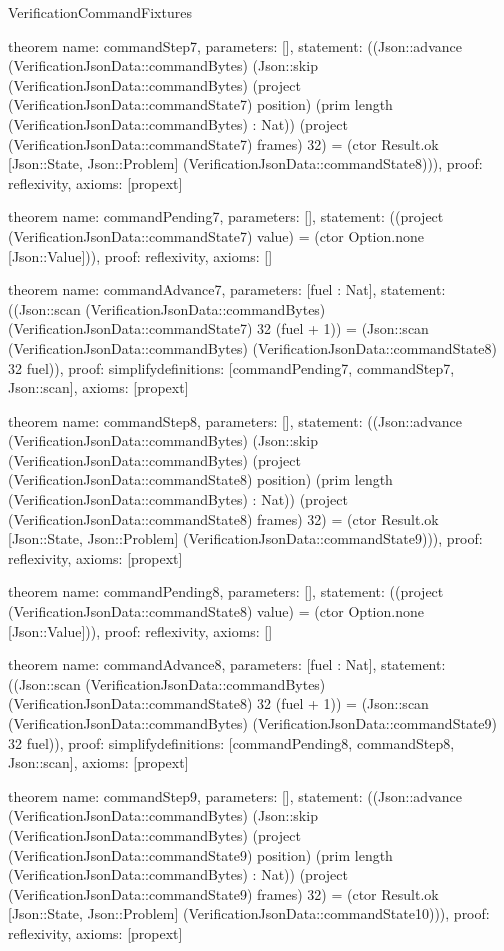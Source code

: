 \begin{lexlean}{VerificationCommandFixtures}
\begin{semanticmodule}
theorem{
  name: commandStep7,
  parameters: [],
  statement: ((Json::advance (VerificationJsonData::commandBytes) (Json::skip (VerificationJsonData::commandBytes) (project (VerificationJsonData::commandState7) position) (prim length (VerificationJsonData::commandBytes) : Nat)) (project (VerificationJsonData::commandState7) frames) 32) = (ctor Result.ok [Json::State, Json::Problem] (VerificationJsonData::commandState8))),
  proof: reflexivity{},
  axioms: [propext]
}

theorem{
  name: commandPending7,
  parameters: [],
  statement: ((project (VerificationJsonData::commandState7) value) = (ctor Option.none [Json::Value])),
  proof: reflexivity{},
  axioms: []
}

theorem{
  name: commandAdvance7,
  parameters: [fuel : Nat],
  statement: ((Json::scan (VerificationJsonData::commandBytes) (VerificationJsonData::commandState7) 32 (fuel + 1)) = (Json::scan (VerificationJsonData::commandBytes) (VerificationJsonData::commandState8) 32 fuel)),
  proof: simplify{definitions: [commandPending7, commandStep7, Json::scan]},
  axioms: [propext]
}

theorem{
  name: commandStep8,
  parameters: [],
  statement: ((Json::advance (VerificationJsonData::commandBytes) (Json::skip (VerificationJsonData::commandBytes) (project (VerificationJsonData::commandState8) position) (prim length (VerificationJsonData::commandBytes) : Nat)) (project (VerificationJsonData::commandState8) frames) 32) = (ctor Result.ok [Json::State, Json::Problem] (VerificationJsonData::commandState9))),
  proof: reflexivity{},
  axioms: [propext]
}

theorem{
  name: commandPending8,
  parameters: [],
  statement: ((project (VerificationJsonData::commandState8) value) = (ctor Option.none [Json::Value])),
  proof: reflexivity{},
  axioms: []
}

theorem{
  name: commandAdvance8,
  parameters: [fuel : Nat],
  statement: ((Json::scan (VerificationJsonData::commandBytes) (VerificationJsonData::commandState8) 32 (fuel + 1)) = (Json::scan (VerificationJsonData::commandBytes) (VerificationJsonData::commandState9) 32 fuel)),
  proof: simplify{definitions: [commandPending8, commandStep8, Json::scan]},
  axioms: [propext]
}

theorem{
  name: commandStep9,
  parameters: [],
  statement: ((Json::advance (VerificationJsonData::commandBytes) (Json::skip (VerificationJsonData::commandBytes) (project (VerificationJsonData::commandState9) position) (prim length (VerificationJsonData::commandBytes) : Nat)) (project (VerificationJsonData::commandState9) frames) 32) = (ctor Result.ok [Json::State, Json::Problem] (VerificationJsonData::commandState10))),
  proof: reflexivity{},
  axioms: [propext]
}


\end{semanticmodule}
\end{lexlean}
